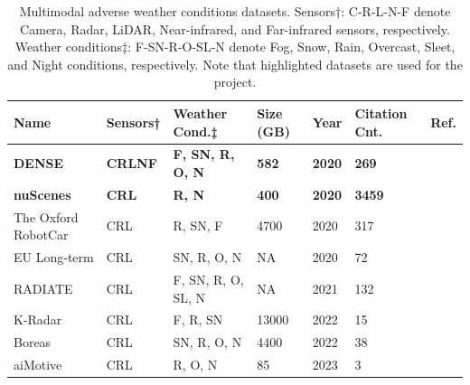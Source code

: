 \documentclass[report.tex]{subfiles}
\begin{document}
    \begin{table}[!ht]
        \centering
        \caption{Multimodal adverse weather conditions datasets. Sensors†: C-R-L-N-F denote Camera, Radar, LiDAR, Near-infrared, and Far-infrared sensors, respectively. Weather conditions‡: F-SN-R-O-SL-N denote Fog, Snow, Rain, Overcast, Sleet, and Night conditions, respectively. Note that highlighted datasets are used for the project.}
        \begin{tabular}{|l|l|l|l|l|l|l|}
        \hline
            \textbf{Name} & \textbf{Sensors†} & \textbf{Weather Cond.‡} & \textbf{Size (GB)} & \textbf{Year} & \textbf{Citation Cnt.} & \textbf{Ref.} \\ \hline
            \textbf{DENSE} & \textbf{CRLNF} & \textbf{F, SN, R, O, N} & \textbf{582} & \textbf{2020} & \textbf{269} & \textbf{\cite{bijelic2020seeing}} \\ \hline
            \textbf{nuScenes} & \textbf{CRL} & \textbf{R, N} & \textbf{400} & \textbf{2020} & \textbf{3459} & \textbf{\cite{caesar2020nuscenes}} \\ \hline
            The Oxford RobotCar & CRL & R, SN, F & 4700 & 2020 & 317 & \cite{barnes2020oxford} \\ \hline
            EU Long-term & CRL & SN, R, O, N & NA & 2020 & 72 & \cite{yan2020eu} \\ \hline
            RADIATE & CRL & F, SN, R, O, SL, N & NA & 2021 & 132 & \cite{sheeny2021radiate} \\ \hline
            K-Radar & CRL & F, R, SN & 13000 & 2022 & 15 & \cite{Paek2022Jun} \\ \hline
            Boreas & CRL & SN, R, O, N & 4400 & 2022 & 38 & \cite{burnett2022boreas} \\ \hline
            aiMotive & CRL & R, O, N & 85 & 2023 & 3 & \cite{matuszka2022aimotive} \\ \hline
        \end{tabular}
        \label{datasets}
    \end{table}


\end{document}
